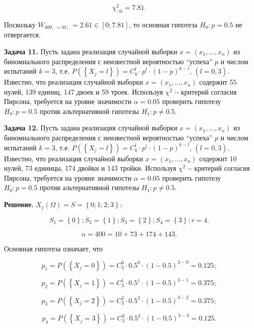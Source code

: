 \[\chi _{:@}^{2} =7.81.\] 

Поскольку $W_{400,\; =01;.} =2.61\in \left[0;7.81\right]$, то основная гипотеза $H_{0} :p=0.5$ не отвергается.



\textbf{Задача 11.} Пусть задана реализация случайной выборки $x=\left(x_{1} ,...,x_{n} \right)$ из биномиального распределения с неизвестной вероятностью ``успеха'' $p$ и числом испытаний $k=3$, т.е. $P\left(\left\{X_{j} =l\right\}\right)=C_{k}^{l} \cdot p^{l} \cdot \left(1-p\right)^{k-l} $, $\left(l=\overline{0,3}\right)$. Известно, что реализация случайной выборки $x=\left(x_{1} ,...,x_{n} \right)$ содержит 55 нулей, 139 единиц, 147 двоек и 59 троек. Используя $\chi ^{2} -$критерий согласия Пирсона, требуется на уровне значимости $\alpha =0.05$ проверить гипотезу $H_{0} :p=0.5$ против альтернативной гипотезы $H_{1} :p\ne 0.5$.



\textbf{Задача 12.} Пусть задана реализация случайной выборки $x=\left(x_{1} ,...,x_{n} \right)$ из биномиального распределения с неизвестной вероятностью ``успеха'' $p$ и числом испытаний $k=3$, т.е. $P\left(\left\{X_{j} =l\right\}\right)=C_{k}^{l} \cdot p^{l} \cdot \left(1-p\right)^{k-l} $, $\left(l=\overline{0,3}\right)$. Известно, что реализация случайной выборки $x=\left(x_{1} ,...,x_{n} \right)$ содержит 10 нулей, 73 единицы, 174 двойки и 143 тройки. Используя $\chi ^{2} -$критерий согласия Пирсона, требуется на уровне значимости $\alpha =0.05$ проверить гипотезу $H_{0} :p=0.5$ против альтернативной гипотезы $H_{1} :p\ne 0.5$.

\textbf{Решение.} $X_{j} \left(\Omega \right)=S=\left\{0;1;2;3\right\}$;

\[S_{1} =\left\{0\right\}; S_{2} =\left\{1\right\}; S_{3} =\left\{2\right\}; S_{4} =\left\{3\right\}; r=4.\] 

\[n=400=10+73+174+143.\] 

Основная гипотеза означает, что

\[p_{1} =P\left(\left\{X_{j} =0\right\}\right)=C_{3}^{0} \cdot 0.5^{0} \cdot \left(1-0.5\right)^{3-0} =0.125;\] 

\[p_{2} =P\left(\left\{X_{j} =1\right\}\right)=C_{3}^{1} \cdot 0.5^{1} \cdot \left(1-0.5\right)^{3-1} =0.375;\] 

\[p_{3} =P\left(\left\{X_{j} =2\right\}\right)=C_{3}^{2} \cdot 0.5^{2} \cdot \left(1-0.5\right)^{3-2} =0.375;\] 

\[p_{4} =P\left(\left\{X_{j} =3\right\}\right)=C_{3}^{3} \cdot 0.5^{3} \cdot \left(1-0.5\right)^{3-3} =0.125.\] 

